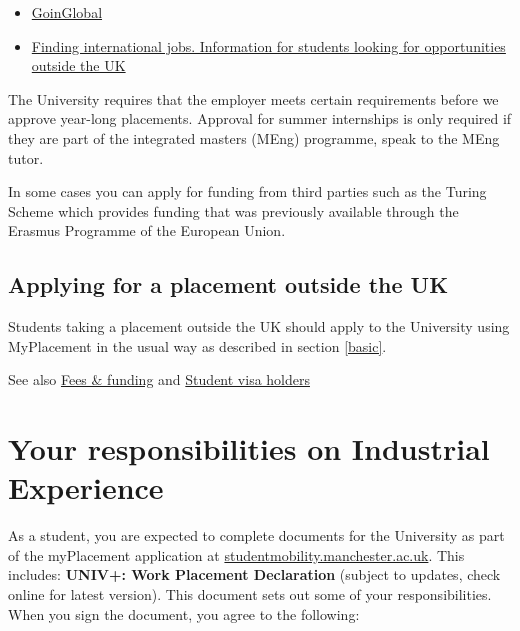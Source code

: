 \documentclass[
]{book}
\providecommand{\tightlist}{%
  \setlength{\itemsep}{0pt}\setlength{\parskip}{0pt}}
\begin{document}
\begin{itemize}
\tightlist
\item
  \href{https://www.careers.manchester.ac.uk/international/goinglobal/}{GoinGlobal} \citep{goinglobal}
\item
  \href{https://www.careers.manchester.ac.uk/international/internationaljobs/}{Finding international jobs. Information for students looking for opportunities outside the UK} \citep{interjobs}
\end{itemize}

The University requires that the employer meets certain requirements before we approve year-long placements. Approval for summer internships is only required if they are part of the integrated masters (MEng) programme, speak to the MEng tutor.

In some cases you can apply for funding from third parties such as the Turing Scheme which provides funding that was previously available through the Erasmus Programme of the European Union. \citep{turing}

\section{Applying for a placement outside the UK}\label{outside}

Students taking a placement outside the UK should apply to the University using MyPlacement in the usual way as described in section \ref{basic}.

See also \href{https://www.manchester.ac.uk/study/undergraduate/fees-and-funding/}{Fees \& funding} and \href{https://www.studentsupport.manchester.ac.uk/immigration-and-visas/}{Student visa holders}

\chapter{Your responsibilities on Industrial Experience}\label{you}

As a student, you are expected to complete documents for the University as part of the myPlacement application at \href{https://studentmobility.manchester.ac.uk/}{studentmobility.manchester.ac.uk}. This includes: \textbf{UNIV+: Work Placement Declaration }(subject to updates, check online for latest version). This document sets out some of your responsibilities. When you sign the document, you agree to the following:
\end{document}
